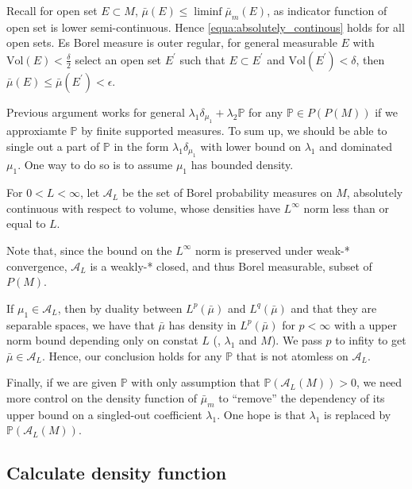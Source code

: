 Recall for open set $E \subset M$, $\bar{\mu}(E) \leq \liminf \bar{\mu}_m(E)$,
as indicator function of open set is lower semi-continuous.
Hence \cref{equa:absolutely_continous} holds for all open sets.
Es Borel measure is outer regular, for general measurable $E$ with $\text{Vol}(E) < \frac{\delta}{2}$
select an open set $E^\prime$ such that
$ E \subset E^\prime$ and $ \text{Vol}(E^\prime) < \delta$,
then $\bar{\mu}(E) \leq \bar{\mu}(E^\prime) < \epsilon$.

Previous argument works for general $\lambda_1 \delta_{\mu_1} + \lambda_2 \mathbb{P}$ for any $\mathbb{P} \in P(P(M))$
if we approxiamte $\mathbb{P}$ by finite supported measures.
To sum up, we should be able to single out a part of $\mathbb{P}$ in the form $\lambda_1 \delta_{\mu_1}$
with lower bound on $\lambda_1$ and dominated $\mu_1$.
One way to do so is to assume $\mu_1$ has bounded density.
\begin{defn}
	For \( 0 < L < \infty \), let \( \mathcal { A } _ { L } \) be the set of Borel probability
	measures on \( M \), absolutely continuous with respect to volume, whose densities have \( L ^ { \infty } \)
	norm less than or equal to \( L\).
\end{defn}

Note that, since the bound on the \( L ^ { \infty } \) norm is preserved under weak-* convergence,
\( \mathcal { A } _ { L } \) is a weakly-* closed, and thus Borel measurable, subset of \( P ( M ) \).

If $\mu_1 \in \mathcal{A}_L$, then by duality between $L^p(\bar{\mu})$ and $L^q(\bar{\mu})$
and that they are separable spaces,
we have that $\bar{\mu}$ has density in $L^p(\bar{\mu})$ for
$p < \infty$ with a upper norm bound depending only on constat $L$ (, $\lambda_1$ and $M$).
We pass $p$ to infity to get $\bar{\mu} \in \mathcal{A}_L$.
Hence, our conclusion holds for any $\mathbb{P}$ that is not atomless on $\mathcal{A}_L$.

Finally, if we are given $\mathbb{P}$ with only assumption that $\mathbb{P}(\mathcal{A}_L(M)) > 0$,
we need more control on the density function of $\bar{\mu}_m$
to ``remove'' the dependency of its upper bound on a singled-out coefficient $\lambda_1$.
One hope is that $\lambda_1$ is replaced by $\mathbb{P}(\mathcal{A}_L(M))$.

\subsection{Calculate density function}

